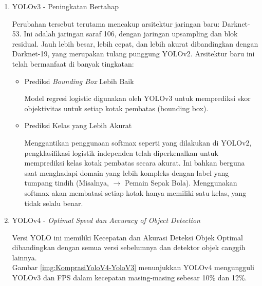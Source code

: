 \begin{enumerate}
	\item YOLOv3 - Peningkatan Bertahap
	
	Perubahan tersebut terutama mencakup arsitektur jaringan baru: Darknet-53. Ini adalah jaringan saraf 106, dengan jaringan upsampling dan blok residual. Jauh lebih besar, lebih cepat, dan lebih akurat dibandingkan dengan Darknet-19, yang merupakan tulang punggung YOLOv2. Arsitektur baru ini telah bermanfaat di banyak tingkatan:
	
	\begin{itemize}
		\item Prediksi \textit{Bounding Box} Lebih Baik
		
		Model regresi logistic digunakan oleh YOLOv3 untuk memprediksi skor objektivitas untuk setiap kotak pembatas (bounding box).
		
		\item Prediksi Kelas yang Lebih Akurat
		
		Menggantikan penggunaan softmax seperti yang dilakukan di YOLOv2, pengklasifikasi logistik independen telah diperkenalkan untuk memprediksi kelas kotak pembatas secara akurat. Ini bahkan berguna saat menghadapi domain yang lebih kompleks dengan label yang tumpang tindih (Misalnya, $\rightarrow$ Pemain Sepak Bola). Menggunakan softmax akan membatasi setiap kotak hanya memiliki satu kelas, yang tidak selalu benar.
		
	\end{itemize}
	
	\item YOLOv4 - \textit{Optimal Speed dan Accuracy of Object Detection}
	
	Versi YOLO ini memiliki Kecepatan dan Akurasi Deteksi Objek Optimal dibandingkan dengan semua versi sebelumnya dan detektor objek canggih lainnya.\\
	Gambar \ref{img:KomprasiYoloV4-YoloV3} menunjukkan YOLOv4 mengungguli YOLOv3 dan FPS dalam kecepatan masing-masing sebesar 10\% dan 12\%.
	

\end{enumerate}
